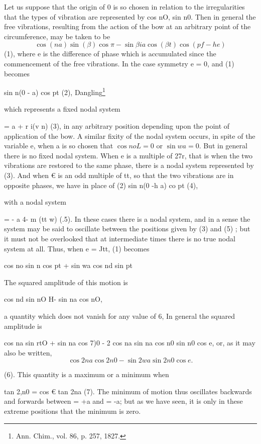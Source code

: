 Let us suppose that the origin of 0 is so chosen in relation to the
irregularities that the types of vibration are represented by
cos nO, sin n0. Then in general the free vibrations, resulting from the action
of the bow at an arbitrary point of the circumference, may be taken to be
\[
\cos( na ) \sin (\beta)  \cos \pi - \sin \beta ia \cos(  \beta t)  \cos (pf -h e)
\]
(1), where e is the difference of phase which is accumulated since
the commencement of the free vibrations. In the case
symmetry e = 0, and (1) becomes

sin n(0 - a) cos pt (2),
Dangling\footnote{Ann. Chim., vol. 86, p. 257, 1827.}

which represents a fixed nodal system

 = a + r i(v n) (3),
in any arbitrary position depending upon the point of application
of the bow. A similar fixity of the nodal system occurs, in spite
of the variable e, when a is so chosen that \( \cos noL = 0\) or  \( \sin wa = 0\).
But in general there is no fixed nodal system. When e is a
multiple of 27r, that is when the two vibrations are restored to
the same phase, there is a nodal system represented by (3). And
when € is an odd multiple of tt, so that the two vibrations are in
opposite phases, we have in place of (2)
sin n(0 -h a) co pt (4),

with a nodal system

= - a 4- m (tt w) (.5).
In these cases there is a nodal system, and in a sense the system
may be said to oscillate between the positions given by (3) and (5) ;
but it must not be overlooked that at intermediate times there is
no true nodal system at all. Thus, when e = Jtt, (1) becomes

cos no sin n cos pt + sin wa cos nd sin pt

The squared amplitude of this motion is

cos nd sin nO H- sin na cos nO,

a quantity which does not vanish for any value of 6, In general
the squared amplitude is

cos na sin rtO + sin na cos 7)0 - 2 cos na sin na cos n0 sin n0 cos e,
or, as it may also be written,
\[ \cos 2na \cos 2n0 -  \sin 2wa \sin 2n0 \cos e.\]

(6).  This quantity is a maximum or a minimum when

tan 2,n0 = cos € tan 2na (7).
The minimum of motion thus oscillates backwards and forwards
between = +a and = -a; but as we have seen, it is only in
these extreme positions that the minimum is zero.


